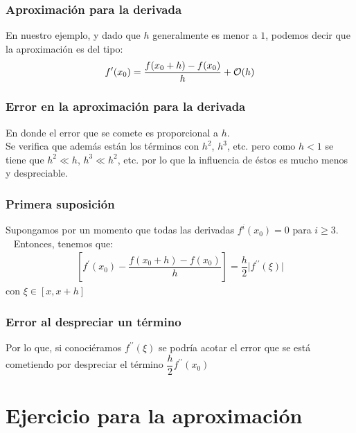 \begin{frame}
\frametitle{Aproximación para la derivada}
En nuestro ejemplo, y dado que $h$ generalmente es menor a $1$, podemos decir que la aproximación es del tipo:
\begin{align*}
f^{\prime}(x_{0}) = \dfrac{f(x_{0} + h) - f(x_{0})}{h} +  \order{h}
\end{align*}
\end{frame}
\begin{frame}
\frametitle{Error en la aproximación para la derivada}
En donde el error que se comete es proporcional a $h$.
\\
\medskip
\pause
Se verifica que además están los términos con $h^{2}$, $h^{3}$, etc. pero como $h<1$ se tiene que $h^{2}  \ll h$, $h^{3} \ll h^{2}$, etc. por lo que la influencia de éstos es mucho menos y despreciable.
\end{frame}
\begin{frame}
\frametitle{Primera suposición}
Supongamos por un momento que todas las derivadas $f^{i}(x_{0}) = 0$ para $i \geq 3$.
\\\
\bigskip
\pause
Entonces, tenemos que:
\begin{align*}
\left[ f^{\prime}(x_{0}) - \dfrac{f(x_{0} + h) - f(x_{0})}{h} \right] = \dfrac{h}{2} \vert f^{\prime \prime}(\xi) \vert
\end{align*}
con $\xi \in [x, x + h]$
\end{frame}
\begin{frame}
\frametitle{Error al despreciar un término}
Por lo que, si conociéramos $f^{\prime \prime}(\xi)$ se podría acotar el error que se está cometiendo por despreciar el término $\dfrac{h}{2} f^{\prime \prime}(x_{0})$
\end{frame}
\section{Ejercicio para la aproximación}
